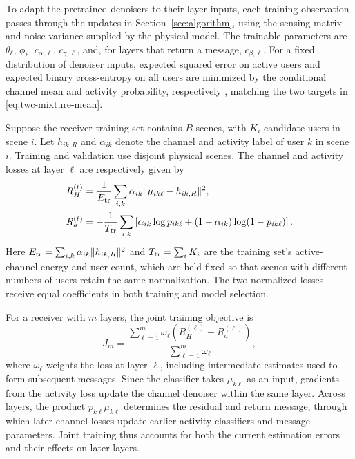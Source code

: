 To adapt the pretrained denoisers to their layer inputs, each
training observation passes through the updates in
Section~\ref{sec:algorithm}, using the sensing matrix and noise variance
supplied by the physical model. The trainable parameters are
$\theta_\ell$, $\phi_\ell$, $c_{\alpha,\ell}$, $c_{\gamma,\ell}$,
and, for layers that return a message, $c_{\beta,\ell}$.
For a fixed distribution of denoiser inputs, expected squared error on
active users and expected binary cross-entropy on all users are minimized by the
conditional channel mean and activity probability, respectively
\cite{menon2016}, matching the two targets in
\eqref{eq:twc-mixture-mean}.

Suppose the receiver training set contains $B$ scenes, with $K_i$
candidate users in scene $i$. Let $h_{ik,R}$ and $\alpha_{ik}$
denote the channel and activity label of user $k$ in scene $i$.
Training and validation use disjoint physical scenes.
The channel and activity losses at layer $\ell$ are respectively
given by
\begin{align}
 R_H^{(\ell)}&=\frac{1}{E_{\rm tr}}\sum_{i,k}
       \alpha_{ik}\|\mu_{ik\ell}-h_{ik,R}\|^2,
 \label{eq:twc-channel-loss}\\
 R_a^{(\ell)}&=-\frac{1}{T_{\rm tr}}\sum_{i,k}
       \left[\alpha_{ik}\log p_{ik\ell}
       +(1-\alpha_{ik})\log(1-p_{ik\ell})\right].
 \label{eq:twc-activity-loss}
\end{align}
Here $E_{\rm tr}=\sum_{i,k}\alpha_{ik}\|h_{ik,R}\|^2$ and
$T_{\rm tr}=\sum_i K_i$ are the training set's active-channel energy
and user count, which are held fixed so that scenes with different
numbers of users retain the same normalization. The two normalized
losses receive equal coefficients in both training and model selection.

For a receiver with $m$ layers, the joint training objective is
\begin{equation}
 J_m=\frac{\sum_{\ell=1}^{m}\omega_\ell
                  \left(R_H^{(\ell)}+R_a^{(\ell)}\right)}
                 {\sum_{\ell=1}^{m}\omega_\ell},
 \label{eq:twc-layer-objective}
\end{equation}
where $\omega_\ell$ weights the loss at layer $\ell$, including
intermediate estimates used to form subsequent messages. Since the
classifier takes $\mu_{k\ell}$ as an input, gradients from the activity
loss update the channel denoiser within the same layer. Across layers,
the product $p_{k\ell}\mu_{k\ell}$ determines the residual and return
message, through which later channel losses update earlier activity
classifiers and message parameters. Joint training thus accounts for
both the current estimation errors and their effects on later layers.


